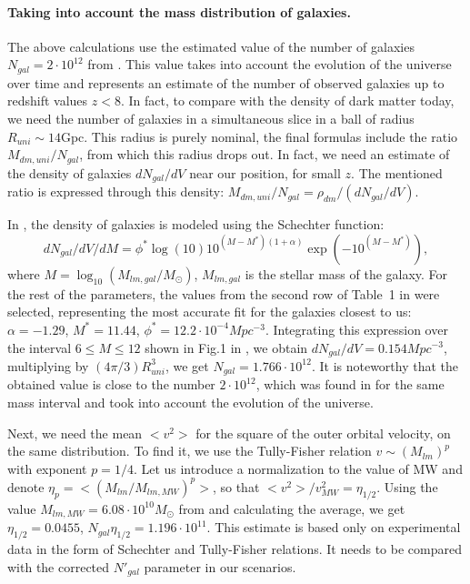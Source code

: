 \documentclass{article}
\begin{document}
\paragraph {Taking into account the mass distribution of galaxies.} The above calculations use the estimated value of the number of galaxies $ N_ {gal} = 2 \cdot10 ^ {12} $ from \cite {1607.03909v2}. This value takes into account the evolution of the universe over time and represents an estimate of the number of observed galaxies up to redshift values $ z <8 $. In fact, to compare with the density of dark matter today, we need the number of galaxies in a simultaneous slice in a ball of radius $ R_ {uni} \sim14 $Gpc. This radius is purely nominal, the final formulas include the ratio $ M_ {dm, uni} / N_ {gal} $, from which this radius drops out. In fact, we need an estimate of the density of galaxies $ dN_ {gal} / dV $ near our position, for small $ z $. The mentioned ratio is expressed through this density: $ M_ {dm, uni} / N_ {gal} = \rho_ {dm} / (dN_ {gal} / dV) $.

In \cite {1607.03909v2}, the density of galaxies is modeled using the Schechter function:
\begin{equation}
dN_{gal}/dV/dM=\phi^*\log(10)10^{(M-M^*)(1+\alpha)}\exp(-10^{(M-M^*)}),
\end{equation}
where $ M = \log_ {10} (M_ {lm, gal} / M_ \odot) $, $ M_ {lm, gal} $ is the stellar mass of the galaxy. For the rest of the parameters, the values from the second row of Table~1 in \cite {1607.03909v2} were selected, representing the most accurate fit for the galaxies closest to us: $ \alpha = -1.29 $, $ M ^ * = 11.44 $, $ \phi ^ * = 12.2 \cdot10 ^ {- 4} Mpc ^ {- 3} $. Integrating this expression over the interval $ 6 \leq M \leq12 $ shown in Fig.1 in \cite {1607.03909v2}, we obtain $ dN_ {gal} /dV=0.154Mpc ^ {- 3} $, multiplying by $ (4 \pi / 3) R_ {uni} ^ 3 $, we get $ N_ {gal} = 1.766 \cdot10 ^ {12} $. It is noteworthy that the obtained value is close to the number $ 2 \cdot10 ^ {12} $, which was found in \cite {1607.03909v2} for the same mass interval and took into account the evolution of the universe.

Next, we need the mean $ <v ^ 2> $ for the square of the outer orbital velocity, on the same distribution. To find it, we use the Tully-Fisher relation $ v \sim (M_ {lm}) ^ p $ with exponent $ p = 1/4 $. Let us introduce a normalization to the value of MW and denote $ \eta_p = <(M_ {lm} / M_ {lm, MW}) ^ p> $, so that $ <v ^ 2> / v_ {MW} ^ 2 = \eta_ {1 / 2} $. Using the value $ M_ {lm, MW} = 6.08 \cdot10 ^ {10} M_ \odot $ from \cite {1407.1078} and calculating the average, we get $ \eta_ {1/2} = 0.0455 $, $ N_ {gal} \eta_ {1/2} = 1.196 \cdot10 ^ {11} $. This estimate is based only on experimental data in the form of Schechter and Tully-Fisher relations. It needs to be compared with the corrected $ N '_ {gal} $ parameter in our scenarios.
\end{document}
